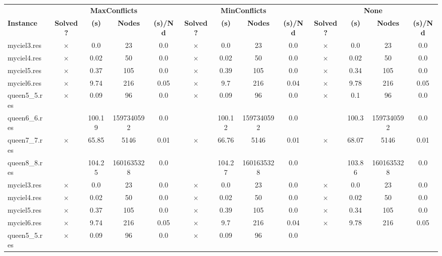 \documentclass[main.tex]{subfiles}
\begin{document}
\thispagestyle{empty}

\begin{landscape}
\begin{center}
\renewcommand{\arraystretch}{1.4} 
\begin{tabular}{l
cccccccccccc}
	\hline
 & \multicolumn{4}{c}{\textbf{MaxConflicts}} & \multicolumn{4}{c}{\textbf{MinConflicts}} & \multicolumn{4}{c}{\textbf{None}}\\
\textbf{Instance}  & \textbf{Solved ?} & \textbf{(s)} & \textbf{Nodes} & \textbf{(s)/Nd} & \textbf{Solved ?} & \textbf{(s)} & \textbf{Nodes} & \textbf{(s)/Nd} & \textbf{Solved ?} & \textbf{(s)} & \textbf{Nodes} & \textbf{(s)/Nd}\\\hline

myciel3.res & $\times$ & 0.0 & 23 & 0.0
 & $\times$ & 0.0 & 23 & 0.0
 & $\times$ & 0.0 & 23 & 0.0
\\
myciel4.res & $\times$ & 0.02 & 50 & 0.0
 & $\times$ & 0.02 & 50 & 0.0
 & $\times$ & 0.02 & 50 & 0.0
\\
myciel5.res & $\times$ & 0.37 & 105 & 0.0
 & $\times$ & 0.39 & 105 & 0.0
 & $\times$ & 0.34 & 105 & 0.0
\\
myciel6.res & $\times$ & 9.74 & 216 & 0.05
 & $\times$ & 9.7 & 216 & 0.04
 & $\times$ & 9.78 & 216 & 0.05
\\
queen5\_5.res & $\times$ & 0.09 & 96 & 0.0
 & $\times$ & 0.09 & 96 & 0.0
 & $\times$ & 0.1 & 96 & 0.0
\\
queen6\_6.res &  & 100.19 & 1597340592 & 0.0
 &  & 100.12 & 1597340592 & 0.0
 &  & 100.3 & 1597340592 & 0.0
\\
queen7\_7.res & $\times$ & 65.85 & 5146 & 0.01
 & $\times$ & 66.76 & 5146 & 0.01
 & $\times$ & 68.07 & 5146 & 0.01
\\
queen8\_8.res &  & 104.25 & 1601635328 & 0.0
 &  & 104.27 & 1601635328 & 0.0
 &  & 103.86 & 1601635328 & 0.0
\\
myciel3.res & $\times$ & 0.0 & 23 & 0.0
 & $\times$ & 0.0 & 23 & 0.0
 & $\times$ & 0.0 & 23 & 0.0
\\
myciel4.res & $\times$ & 0.02 & 50 & 0.0
 & $\times$ & 0.02 & 50 & 0.0
 & $\times$ & 0.02 & 50 & 0.0
\\
myciel5.res & $\times$ & 0.37 & 105 & 0.0
 & $\times$ & 0.39 & 105 & 0.0
 & $\times$ & 0.34 & 105 & 0.0
\\
myciel6.res & $\times$ & 9.74 & 216 & 0.05
 & $\times$ & 9.7 & 216 & 0.04
 & $\times$ & 9.78 & 216 & 0.05
\\
queen5\_5.res & $\times$ & 0.09 & 96 & 0.0
 & $\times$ & 0.09 & 96 & 0.0

\end{tabular}
\end{center}
\end{landscape}
\end{document}
